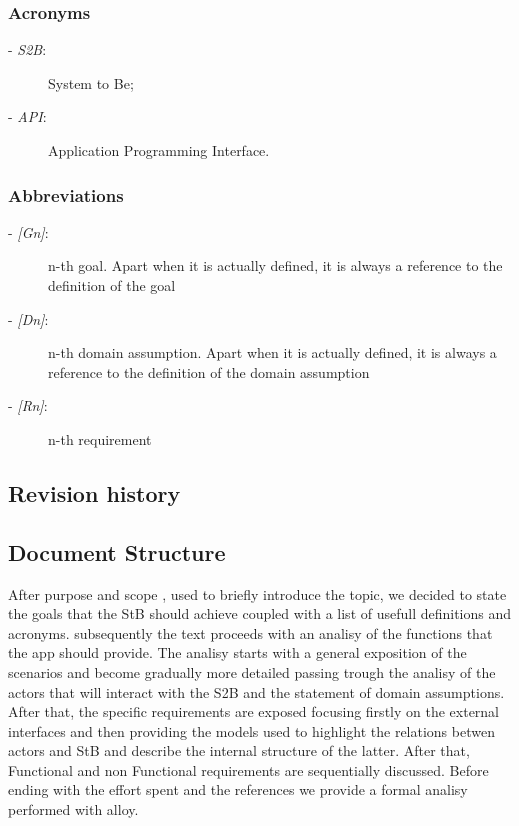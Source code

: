 	\subsubsection{Acronyms}
		\begin{description}
		\item[- \textit{S2B}:] System to Be;
		\item[- \textit{API}:] Application Programming Interface.
	\end{description}
	\subsubsection{Abbreviations}
		\begin{description}
			\item[- \textit{[Gn]}:] n-th goal. Apart when it is actually defined, it is always a reference to the definition of the goal
			\item[- \textit{[Dn]}:] n-th domain assumption. Apart when it is actually defined, it is always a reference to the definition of the domain assumption
			\item[- \textit{[Rn]}:] n-th requirement
		\end{description}
\subsection{Revision history}
\subsection{Document Structure}
After purpose and scope , used to briefly introduce the topic, we decided to state the goals that the StB should achieve coupled with a list of usefull  definitions and acronyms.
subsequently the text proceeds with an analisy of the functions that the app should provide. The analisy starts with a general exposition of the scenarios and become gradually more detailed passing trough the analisy of the actors that will interact with the S2B and the statement of domain assumptions.
After that, the specific requirements are exposed focusing firstly on the external interfaces and then providing the models used to highlight the relations betwen  actors and StB and describe the internal structure of the latter.
After that, Functional and non Functional requirements are sequentially discussed.
Before ending with the effort spent and the references we provide a formal analisy performed with alloy.